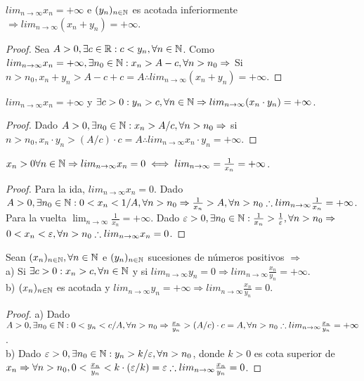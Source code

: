 \begin{prop}
  $lim_{n \to \infty} x_n = + \infty$ e $(y_n)_{n \in \mathbb{N}}$ es acotada inferiormente $\Rightarrow lim_{n \to \infty} (x_n + y_n) = +\infty$.
  \begin{proof}
    Sea $A > 0, \exists c \in \mathbb{R} : c < y_n, \forall n \in \mathbb{N}$.
    Como $lim_{n \to \infty} x_n = + \infty, \exists n_0 \in \mathbb{N} : x_n > A - c, \forall n > n_0 \Rightarrow$
    Si $n > n_0, x_n + y_n > A - c + c = A \therefore lim_{n \to \infty} (x_n + y_n) = +\infty$.
  \end{proof}
\end{prop}

\begin{prop}
  $lim_{n \to \infty} x_n = +\infty$ y $\exists c > 0 : y_n > c, \forall n \in \mathbb{N} \Rightarrow lim_{n \to \infty} (x_n \cdot y_n) = + \infty$.
  \begin{proof}
    Dado $A > 0, \exists n_0 \in \mathbb{N} : x_n > A/c, \forall n > n_0 \Rightarrow$ si $n > n_0, x_n \cdot y_n > (A/c) \cdot c = A \therefore lim_{n \to \infty} x_n \cdot y_n = + \infty$.
  \end{proof}
\end{prop}


\begin{prop}
  $x_n > 0 \forall n \in \mathbb{N} \Rightarrow lim_{n \to \infty} x_n = 0 \iff lim_{n \to \infty} = \frac{1}{x_n} = +\infty$.
  \begin{proof}
    Para la ida, $lim_{n \to \infty} x_n = 0$. Dado $A > 0, \exists n_0 \in \mathbb{N} : 0 < x_n < 1/A, \forall n > n_0 \Rightarrow \frac{1}{x_n} > A, \forall n > n_0 \therefore lim_{n \to \infty} \frac{1}{x_n} = +\infty$. \\
    Para la vuelta $\lim_{n \to \infty} \frac{1}{x_n} = +\infty$. Dado $\varepsilon > 0, \exists n_0 \in \mathbb{N} : \frac{1}{x_n} > \frac{1}{\varepsilon}, \forall n > n_0 \Rightarrow$ \\
    $0 < x_n < \varepsilon, \forall n > n_0 \therefore lim_{n \to \infty} x_n = 0$.
  \end{proof}
\end{prop}

\begin{prop}
  Sean $(x_n)_{n \in \mathbb{N}}, \forall n \in \mathbb{N}$ e $(y_n)_{n \in \mathbb{N}}$ sucesiones de números positivos $\Rightarrow$ \\
  a) Si $\exists c > 0 : x_n > c, \forall n \in \mathbb{N}$ y si $lim_{n \to \infty} y_n = 0 \Rightarrow lim_{n \to \infty} \frac{x_n}{y_n} = +\infty$. \\
  b) $(x_n)_{n \in \mathbb{N}}$ es acotada y $lim_{n \to \infty} y_n = +\infty \Rightarrow lim_{n \to \infty} \frac{x_n}{y_n} = 0$.
  \begin{proof}
    a) Dado $A > 0, \exists n_0 \in \mathbb{N} : 0 < y_n < c/A, \forall n > n_0 \Rightarrow \frac{x_n}{y_n} > (A/c) \cdot c = A, \forall n > n_0 \therefore lim_{n \to \infty} \frac{x_n}{y_n} = + \infty$. \\
    b) Dado $\varepsilon > 0, \exists n_0 \in \mathbb{N} : y_n > k/\varepsilon, \forall n > n_0$, donde $k > 0$ es cota superior de $x_n \Rightarrow \forall n > n_0, 0 < \frac{x_n}{y_n} < k \cdot (\varepsilon/k) = \varepsilon \therefore lim_{n \to \infty} \frac{x_n}{y_n} = 0$.
  \end{proof}
\end{prop}

